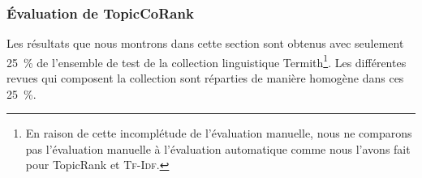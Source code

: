       \subsubsection{Évaluation de TopicCoRank}
      \label{subsubsec:main-domain_specific_keyphrase_annotation-manual_evaluation-analysis-topiccorank}
        Les résultats que nous montrons dans cette section sont obtenus avec
        seulement 25~\% de l'ensemble de test de la collection linguistique
        Termith\footnote{En raison de cette incomplétude de l'évaluation
        manuelle, nous ne comparons pas l'évaluation manuelle à l'évaluation
        automatique comme nous l'avons fait pour TopicRank et \textsc{Tf-Idf}.}.
        Les différentes revues qui composent la collection sont
        réparties de manière homogène dans ces 25~\%.

